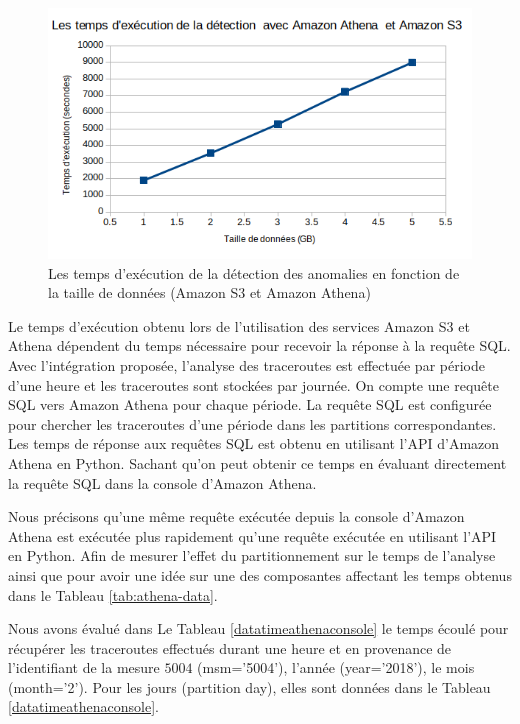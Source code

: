 \begin{figure}[h]
	\centering
	\captionsetup{justification=centering}
	\includegraphics[width=0.7\linewidth]{illustrations/temps-avec-aws_1}
	\caption{Les temps d'exécution de la détection des anomalies en fonction de la taille de données (Amazon S3 et Amazon Athena)}
	\label{fig:temps-avec-aws}
\end{figure}


Le temps d'exécution obtenu lors de l'utilisation des services Amazon S3 et Athena dépendent du temps nécessaire pour recevoir la réponse à la requête SQL. Avec l'intégration proposée, l'analyse des traceroutes est effectuée par période d'une heure et les traceroutes sont stockées par journée. On compte une requête SQL vers Amazon Athena pour chaque période. La requête SQL est configurée pour chercher les traceroutes d'une période dans les partitions  correspondantes. Les temps de réponse aux requêtes SQL est obtenu en utilisant l'API d'Amazon Athena en Python. Sachant qu'on peut obtenir ce temps en évaluant directement la requête SQL dans la console d'Amazon Athena.

Nous précisons qu'une même requête exécutée depuis la console d'Amazon Athena est exécutée plus rapidement qu'une requête exécutée en utilisant l'API en Python. 
Afin de mesurer l'effet du partitionnement sur le temps de l'analyse ainsi que pour avoir une idée sur une des composantes affectant les temps obtenus dans le Tableau \ref{tab:athena-data}.

Nous avons évalué dans  Le Tableau \ref{datatimeathenaconsole}  le temps écoulé pour récupérer les traceroutes effectués durant une heure et  en provenance de l'identifiant de la mesure $5004$ (msm='5004'), l'année (year='2018'), le mois (month='2'). Pour les jours (partition day), elles sont données dans le Tableau   \ref{datatimeathenaconsole}.

